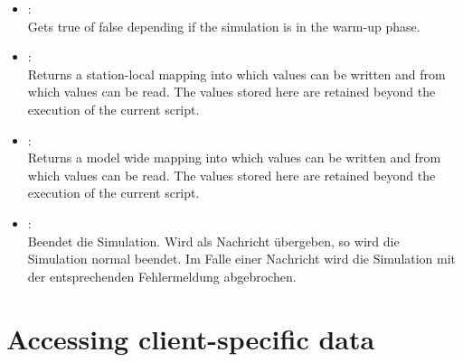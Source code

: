 \begin{itemize}
\item
{}:\\
Gets true of false depending if the simulation is in the warm-up phase.

\item
{}:\\
Returns a station-local mapping into which values can be written and from which values can be read.
The values stored here are retained beyond the execution of the current script.  

\item
{}:\\
Returns a model wide mapping into which values can be written and from which values can be read.
The values stored here are retained beyond the execution of the current script.

\item
{}:\\
Beendet die Simulation. Wird als Nachricht  übergeben, so wird die Simulation normal
beendet. Im Falle einer Nachricht wird die Simulation mit der entsprechenden Fehlermeldung abgebrochen.

\end{itemize}

\section{Accessing client-specific data}

